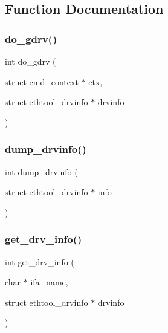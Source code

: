 \subsection{Function Documentation}
\mbox{\label{ethtool-info_8c_a92defcf2493dee90aeaac81e3b15572c}} 
\subsubsection{\texorpdfstring{do\+\_\+gdrv()}{do\_gdrv()}}
{\footnotesize\ttfamily int do\+\_\+gdrv (\begin{DoxyParamCaption}\item[{struct \hyperlink{structcmd__context}{cmd\+\_\+context} $\ast$}]{ctx,  }\item[{struct ethtool\+\_\+drvinfo $\ast$}]{drvinfo }\end{DoxyParamCaption})}

\mbox{\label{ethtool-info_8c_a972c7feb6f25da37144ec7933d787147}} 
\subsubsection{\texorpdfstring{dump\+\_\+drvinfo()}{dump\_drvinfo()}}
{\footnotesize\ttfamily int dump\+\_\+drvinfo (\begin{DoxyParamCaption}\item[{struct ethtool\+\_\+drvinfo $\ast$}]{info }\end{DoxyParamCaption})}

\mbox{\label{ethtool-info_8c_af4d8c485fa8cc199f6e1f27e949c9dc4}} 
\subsubsection{\texorpdfstring{get\+\_\+drv\+\_\+info()}{get\_drv\_info()}}
{\footnotesize\ttfamily int get\+\_\+drv\+\_\+info (\begin{DoxyParamCaption}\item[{char $\ast$}]{ifa\+\_\+name,  }\item[{struct ethtool\+\_\+drvinfo $\ast$}]{drvinfo }\end{DoxyParamCaption})}


